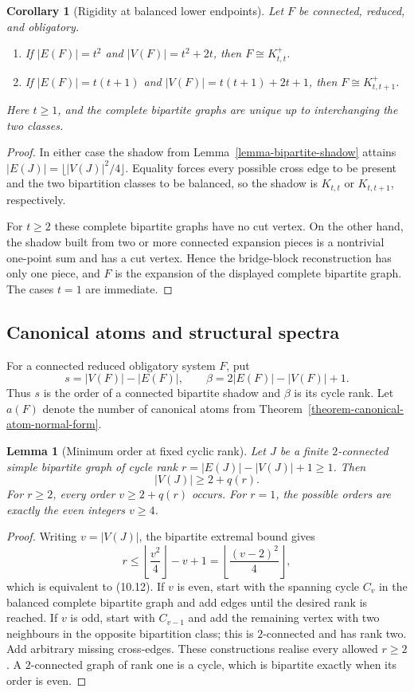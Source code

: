 \documentclass[a4paper,11pt,reqno]{amsart}
\theoremstyle{plain}
\newtheorem{lemma}[theorem]{Lemma}
\newtheorem{corollary}[theorem]{Corollary}
\theoremstyle{definition}
\theoremstyle{remark}
\begin{document}
\begin{corollary}[Rigidity at balanced lower endpoints]
\label{corollary-balanced-endpoint-rigidity}
Let $F$ be connected, reduced, and obligatory.
\begin{enumerate}
\item If $|E(F)|=t^2$ and $|V(F)|=t^2+2t$, then
$F\cong K_{t,t}^+$.
\item If $|E(F)|=t(t+1)$ and $|V(F)|=t(t+1)+2t+1$, then
$F\cong K_{t,t+1}^+$.
\end{enumerate}
Here $t\ge1$, and the complete bipartite graphs are unique up to interchanging
the two classes.
\end{corollary}
\begin{proof}
In either case the shadow from Lemma~\ref{lemma-bipartite-shadow} attains
$|E(J)|=\lfloor|V(J)|^2/4\rfloor$.  Equality forces every possible cross edge
to be present and the two bipartition classes to be balanced, so the shadow is
$K_{t,t}$ or $K_{t,t+1}$, respectively.

For $t\ge2$ these complete bipartite graphs have no cut vertex.  On the other
hand, the shadow built from two or more connected expansion pieces is a
nontrivial one-point sum and has a cut vertex.  Hence the bridge-block
reconstruction has only one piece, and $F$ is the expansion of the displayed
complete bipartite graph.  The cases $t=1$ are immediate.
\end{proof}

\subsection{Canonical atoms and structural spectra}
\label{canonical-atoms-and-structural-spectra}

For a connected reduced obligatory system $F$, put
\[
s=|V(F)|-|E(F)|,
\qquad
\beta=2|E(F)|-|V(F)|+1.
\]
Thus $s$ is the order of a connected bipartite shadow and $\beta$ is its
cycle rank.  Let $a(F)$ denote the number of canonical atoms from
Theorem~\ref{theorem-canonical-atom-normal-form}.

\begin{lemma}[Minimum order at fixed cyclic rank]
\label{lemma-minimum-order-fixed-cyclic-rank}
Let $J$ be a finite $2$-connected simple bipartite graph of cycle rank
$r=|E(J)|-|V(J)|+1\ge1$.  Then
\[
|V(J)|\ge 2+q(r).
\tag{10.12}
\]
For $r\ge2$, every order $v\ge2+q(r)$ occurs.  For $r=1$, the possible orders
are exactly the even integers $v\ge4$.
\end{lemma}
\begin{proof}
Writing $v=|V(J)|$, the bipartite extremal bound gives
\[
r\le\left\lfloor\frac{v^2}{4}\right\rfloor-v+1
 =\left\lfloor\frac{(v-2)^2}{4}\right\rfloor,
\]
which is equivalent to (10.12).  If $v$ is even, start with the spanning cycle
$C_v$ in the balanced complete bipartite graph and add edges until the desired
rank is reached.  If $v$ is odd, start with $C_{v-1}$ and add the remaining
vertex with two neighbours in the opposite bipartition class; this is
$2$-connected and has rank two.  Add arbitrary missing cross-edges.  These
constructions realise every allowed $r\ge2$.  A $2$-connected graph of rank one
is a cycle, which is bipartite exactly when its order is even.
\end{proof}
\end{document}
